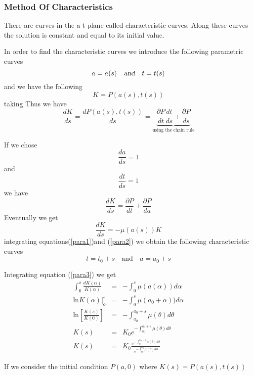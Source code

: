 \subsubsection{Method Of Characteristics}
There are curves in the a-t plane called characteristic curves. Along these curves the solution is constant and equal to its initial value.

In order to find the characteristic curves we introduce the following parametric curves
\[a=a(s) \quad \textsl{and}  \quad t=t(s)\]
 and we have the following
 \[K=P(a(s),t(s))\] taking 
 Thus we have 
 \begin{equation}
 \frac{dK}{ds}=\frac{dP(a(s),t(s))}{ds}=\underbrace{\frac{\partial P}{dt} \frac{dt}{ds} + \frac{\partial P}{ds}}_{\text{using the chain rule}}
 \end{equation}
 
 If we chose
 \begin{equation}\label{para1}
\frac{ da}{ds}=1 
 \end{equation}
 and 
 \begin{equation}\label{para2}
 \frac{dt}{ds}=1
 \end{equation}
 we have 
 \begin{equation}
 \frac{dK}{ds}=\frac{\partial P}{dt} +\frac{\partial P }{da}
 \end{equation}
 Eventually we get
 \begin{equation}\label{para3}
 \frac{dK}{ds}= -\mu(a(s)) K
 \end{equation}
 integrating equations(\ref{para1})and (\ref{para2}) we obtain the following characteristic curves
 \[t = t_0 +s \quad \text{and} \quad a=a_0 + s\]
 
 Integrating equation (\ref{para3}) we get 
 \begin{eqnarray}
  \int^{s}_{0} \frac{dK(\alpha)}{K(\alpha)}&=& -\int^{s}_{0} \mu (a(\alpha)) d \alpha \nonumber \\
  \text{ln} K(\alpha)]_{o}^{s}&=& -\int^{s}_{0}\mu (a_0 + \alpha)) d \alpha \nonumber \\
  \text{ln} [\frac{K(s)}{K(0)}] &=& -\int^{a_0 + s}_{a_0} \mu (\theta) d \theta \nonumber \\
  K(s) &=& K_0 e^{- \int^{a_0 + s}_{a_0} \mu (\theta) d \theta} \nonumber \\
  K(s) &=& K_0 \frac{e^{- \int^{a_0 + s}_{0} \mu (\theta) d \theta}}{e^{- \int^{a_0 }_{0} \mu (\theta) d \theta} }
\end{eqnarray}  
  
If we consider the initial condition $P(a,0)$
where $K(s)= P(a(s),t(s))$

